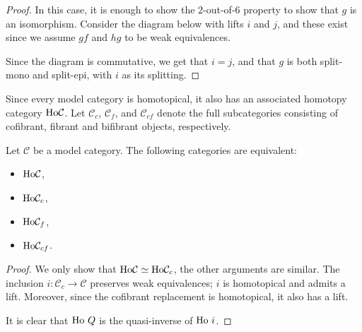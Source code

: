 \documentclass[../thesis.tex]{subfiles}
\begin{document}
\begin{proof}
                In this case, it is enough to show the $2$-out-of-$6$ property to show that $g$ is an isomorphism. Consider the diagram below with lifts $i$ and $j$, and these exist since we assume $gf$ and $hg$ to be weak equivalences.
                \begin{center}
                \end{center}
                Since the diagram is commutative, we get that $i = j$, and that $g$ is both split-mono and split-epi, with $i$ as its splitting.
            \end{proof}

            Since every model category is homotopical, it also has an associated homotopy category $\tt{Ho}\mathcal{C}$. Let $\mathcal{C}_c$, $\mathcal{C}_f$, and $\mathcal{C}_{cf}$ denote the full subcategories consisting of cofibrant, fibrant and bifibrant objects, respectively.

            \begin{proposition}
                Let $\mathcal{C}$ be a model category. The following categories are equivalent:
                \begin{itemize}
                    \item $\tt{Ho}\mathcal{C}$,
                    \item $\tt{Ho}\mathcal{C}_c$,
                    \item $\tt{Ho}\mathcal{C}_f$,
                    \item $\tt{Ho}\mathcal{C}_{cf}$.
                \end{itemize}
            \end{proposition}

            \begin{proof}
                We only show that $\tt{Ho}\mathcal{C} \simeq \tt{Ho}\mathcal{C}_c$, the other arguments are similar. The inclusion $i:\mathcal{C}_c\rightarrow \mathcal{C}$ preserves weak equivalences; $i$ is homotopical and admits a lift. Moreover, since the cofibrant replacement is homotopical, it also has a lift.

                \begin{center}
                \end{center}

                It is clear that $\tt{Ho}\ Q$ is the quasi-inverse of $\tt{Ho}\ i$.
            \end{proof}
\end{document}
